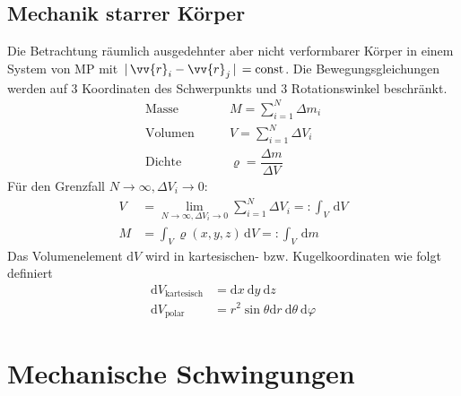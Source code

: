 \documentclass[a4paper,12pt]{article}
\newcommand{\td}{\,\text{d}}
\numberwithin{equation}{section}
\begin{document}
\subsection{Mechanik starrer Körper}
Die Betrachtung räumlich ausgedehnter aber nicht verformbarer Körper in einem System von MP mit $\,|\, \vv{r}_i-\vv{r}_j\,|\, =\text{const}$. Die Bewegungsgleichungen werden auf 3 Koordinaten des Schwerpunkts und 3 Rotationswinkel beschränkt.
\begin{align*}
        \text{Masse}&\qquad M=\sum_{i=1}^{N}\Delta m_i\\
        \text{Volumen}&\qquad V=\sum_{i=1}^{N}\Delta V_i\\
        \text{Dichte}&\qquad \varrho=\dfrac{\Delta m}{\Delta V}
\end{align*}
Für den Grenzfall $N\rightarrow \infty,\Delta V_i\rightarrow 0$:
\begin{align*}
        V&=\lim_{N\rightarrow \infty,\Delta V_i\rightarrow 0}\sum_{i=1}^{N}\Delta V_i=:\int_{V}^{}\td V\\
        M&=\int_{V}^{}\varrho\left(x,y,z\right)\td V=:\int_{V}^{}\td m
\end{align*}
Das Volumenelement $\text{d}V$ wird in kartesischen- bzw. Kugelkoordinaten wie folgt definiert
\begin{align*}
        \text{d}V_{\text{kartesisch}}&=\text{d}x\ \text{d}y\ \text{d}z\\
        \text{d}V_{\text{polar}}&=r^2\sin \theta \text{d}r\ \text{d}\theta\ \text{d}\varphi 
\end{align*}

\section{Mechanische Schwingungen}
\end{document}
